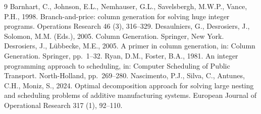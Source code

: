 \documentclass[review,3p,times,authoryear]{elsarticle}
\begin{document}
\begin{thebibliography}{9}
Barnhart, C., Johnson, E.L., Nemhauser, G.L., Savelsbergh, M.W.P., Vance, P.H.,
1998. Branch-and-price: column generation for solving huge integer programs.
Operations Research 46 (3), 316--329.
Desaulniers, G., Desrosiers, J., Solomon, M.M. (Eds.), 2005. Column Generation.
Springer, New York.
Desrosiers, J., L\"ubbecke, M.E., 2005. A primer in column generation, in:
Column Generation. Springer, pp.\ 1--32.
Ryan, D.M., Foster, B.A., 1981. An integer programming approach to scheduling,
in: Computer Scheduling of Public Transport. North-Holland, pp.\ 269--280.
Nascimento, P.J., Silva, C., Antunes, C.H., Moniz, S., 2024. Optimal
decomposition approach for solving large nesting and scheduling problems of
additive manufacturing systems. European Journal of Operational Research 317 (1),
92--110.
\end{thebibliography}
\end{document}
